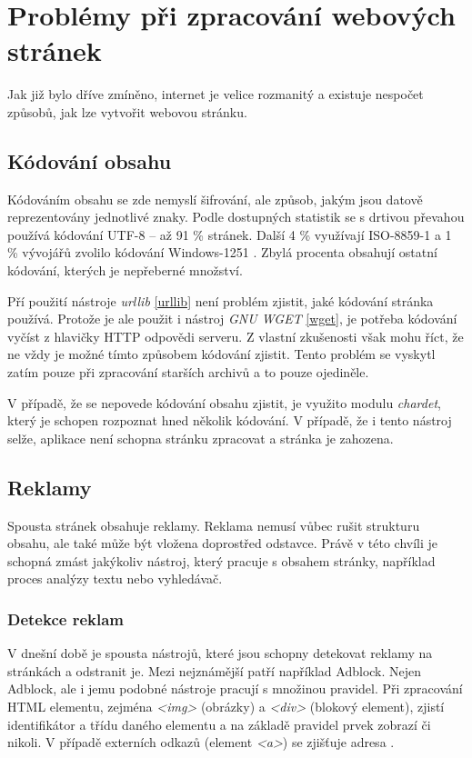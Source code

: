 \section{Problémy při zpracování webových stránek}
Jak již bylo dříve zmíněno, internet je velice rozmanitý a existuje nespočet způsobů, jak lze vytvořit webovou stránku.

\subsection{Kódování obsahu}
Kódováním obsahu se zde nemyslí šifrování, ale způsob, jakým jsou datově reprezentovány jednotlivé znaky. Podle dostupných
statistik se s drtivou převahou používá kódování UTF-8 -- až 91 \% stránek. Další 4 \% využívají ISO-8859-1 a 1 \%
vývojářů zvolilo kódování Windows-1251 \cite{W3TECHS}. Zbylá procenta obsahují ostatní kódování, kterých je nepřeberné množství.

Pří použití nástroje \textit{urllib} \ref{urllib} není problém zjistit, jaké kódování stránka používá. Protože je ale použit
i nástroj \textit{GNU WGET} \ref{wget}, je potřeba kódování vyčíst z hlavičky HTTP odpovědi serveru. Z vlastní zkušenosti však mohu říct, že
ne vždy je možné tímto způsobem kódování zjistit. Tento problém se vyskytl zatím pouze při zpracování starších archivů a to pouze ojediněle.

V případě, že se nepovede kódování obsahu zjistit, je využito modulu \textit{chardet}, který je schopen rozpoznat
hned několik kódování. V případě, že i tento nástroj selže, aplikace není schopna stránku zpracovat a stránka je zahozena.

\subsection{Reklamy}
Spousta stránek obsahuje reklamy. Reklama nemusí vůbec rušit strukturu obsahu, ale také může být vložena doprostřed
odstavce. Právě v této chvíli je schopná zmást jakýkoliv nástroj, který pracuje s obsahem stránky,
například proces analýzy textu nebo vyhledávač.

\subsubsection{Detekce reklam}
V dnešní době je spousta nástrojů, které jsou schopny detekovat reklamy na stránkách a odstranit je. Mezi nejznámější
patří například Adblock. Nejen Adblock, ale i jemu podobné nástroje pracují s množinou pravidel. Při zpracování HTML
elementu, zejména \textit{<img>} (obrázky) a \textit{<div>} (blokový element), zjistí identifikátor a třídu daného elementu a na
základě pravidel prvek zobrazí či nikoli. V případě externích odkazů (element \textit{<a>}) se zjišťuje adresa \cite{ADBLOCK}.

